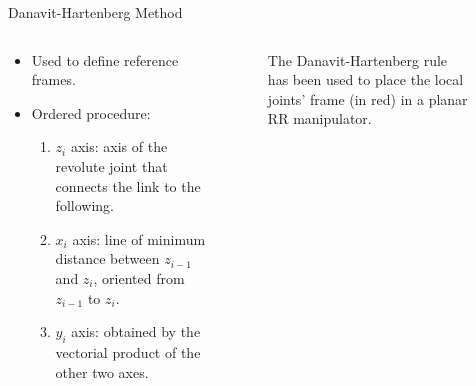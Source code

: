 \begin{frame}{Danavit-Hartenberg Method}
    \begin{columns}
        \begin{column}{0.5\textwidth}
            \begin{itemize}
                \item Used to define reference frames.
                \item Ordered procedure:
                    \begin{enumerate}
                        \item $z_i$ axis: axis of the revolute joint that connects the link to the following.
                        \item $x_i$ axis: line of minimum distance between $z_{i-1}$ and $z_i$, oriented from $z_{i-1}$ to $z_i$.
                        \item $y_i$ axis: obtained by the vectorial product of the other two axes.
                    \end{enumerate}
            \end{itemize}
        \end{column}
        \begin{column}{0.5\textwidth}
            \begin{figure}
                \centering
                \scalebox{0.4}{}
                \caption{The Danavit-Hartenberg rule has been used to place the local joints' frame (in red) in a planar RR manipulator.}
              \end{figure}
        \end{column}
    \end{columns}
\end{frame}

